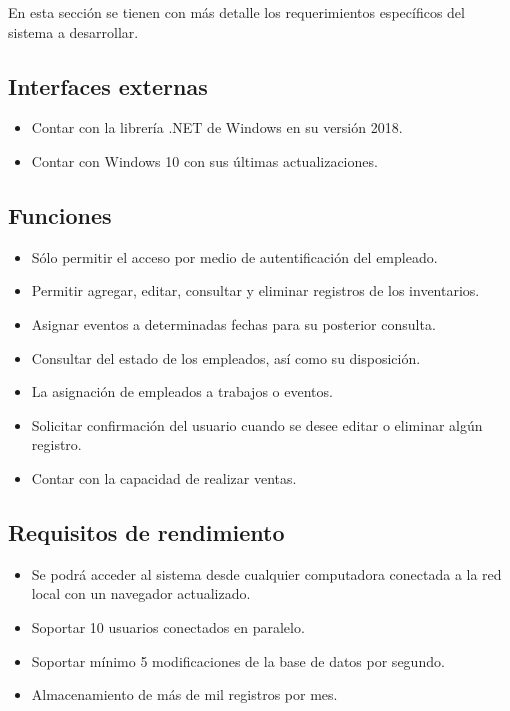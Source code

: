 En esta sección se tienen con más detalle los requerimientos específicos del sistema a desarrollar.

\subsection{Interfaces externas}
\begin{itemize}
\item Contar con la librería .NET de Windows en su versión 2018.
\item Contar con Windows 10 con sus últimas actualizaciones.
\end{itemize}

\subsection{Funciones}
\begin{itemize}
\item Sólo permitir el acceso por medio de autentificación del empleado.
\item Permitir agregar, editar, consultar y eliminar registros de los inventarios.
\item Asignar eventos a determinadas fechas para su posterior consulta.
\item Consultar del estado de los empleados, así como su disposición.
\item La asignación de empleados a trabajos o eventos.
\item Solicitar confirmación del usuario cuando se desee editar o eliminar algún registro.
\item Contar con la capacidad de realizar ventas.
\end{itemize}

\subsection{Requisitos de rendimiento}
\begin{itemize}
\item Se podrá acceder al sistema desde cualquier computadora conectada a la red local
  con un navegador actualizado.
\item Soportar 10 usuarios conectados en paralelo.
\item Soportar mínimo 5 modificaciones de la base de datos por segundo.
\item Almacenamiento de más de mil registros por mes.
\end{itemize}

